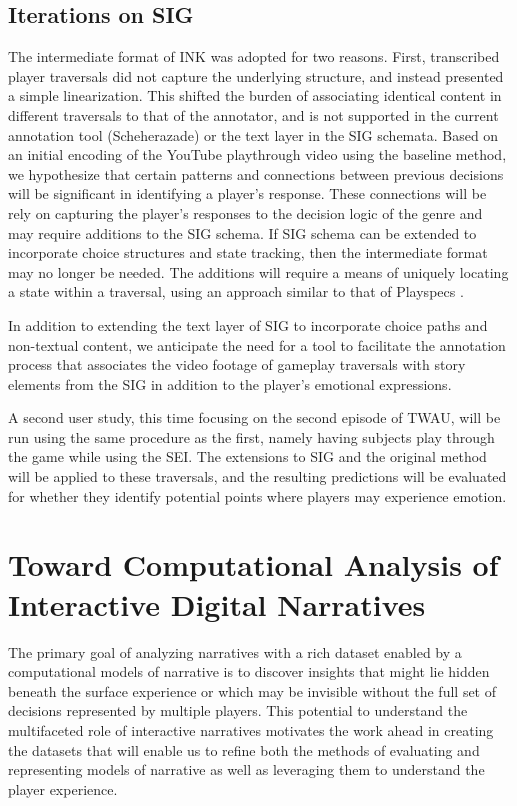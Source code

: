 \subsection{Iterations on SIG}
\label{sec:orgheadline7}
The intermediate format of INK was adopted for two reasons. First,
transcribed player traversals did not capture the underlying
structure, and instead presented a simple linearization. This shifted
the burden of associating identical content in different traversals to
that of the annotator, and is not supported in the current annotation
tool (Scheherazade) or the text layer in the SIG schemata. Based on an
initial encoding of the YouTube playthrough video using the baseline
method, we hypothesize that certain patterns and connections between
previous decisions will be significant in identifying a player's
response. These connections will be rely on capturing the player's
responses to the decision logic of the genre and may require additions
to the SIG schema. If SIG schema can be extended to incorporate choice
structures and state tracking, then the intermediate format may no
longer be needed. The additions will require a means of uniquely
locating a state within a traversal, using an approach similar to that
of Playspecs \cite{Osborn2015-gr}.

In addition to extending the text layer of SIG to incorporate choice
paths and non-textual content, we anticipate the need for a tool to
facilitate the annotation process that associates the video footage of
gameplay traversals with story elements from the SIG in addition to
the player's emotional expressions.

A second user study, this time focusing on the second episode of TWAU,
will be run using the same procedure as the first, namely having
subjects play through the game while using the SEI. The extensions to
SIG and the original method will be applied to these traversals, and
the resulting predictions will be evaluated for whether they identify
potential points where players may experience emotion.

\section{Toward Computational Analysis of Interactive Digital Narratives}
\label{sec:orgheadline9}
The primary goal of analyzing narratives with a rich dataset enabled
by a computational models of narrative is to discover insights that
might lie hidden beneath the surface experience or which may be
invisible without the full set of decisions represented by multiple
players.  This potential to understand the multifaceted role of
interactive narratives motivates the work ahead in creating the
datasets that will enable us to refine both the methods of evaluating
and representing models of narrative as well as leveraging them to
understand the player experience.

